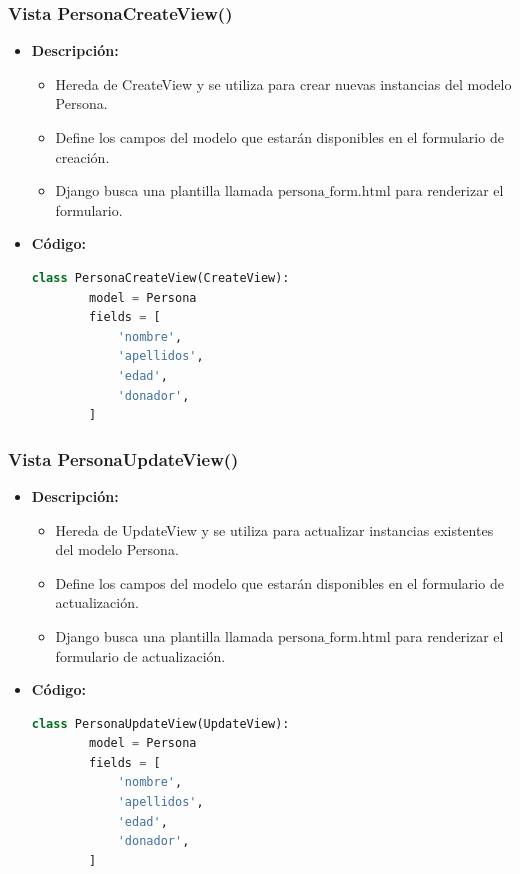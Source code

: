 \documentclass{article}
\begin{document}
  \subsubsection{Vista PersonaCreateView()}
  \begin{itemize}
    \item \textbf{Descripción: }
    \begin{itemize}
      \item Hereda de CreateView y se utiliza para crear nuevas instancias del modelo Persona.
      \item Define los campos del modelo que estarán disponibles en el formulario de creación.
      \item Django busca una plantilla llamada $\text{persona\_form.html}$ para renderizar el formulario.
    \end{itemize}
    \item \textbf{Código: }
    \begin{lstlisting}[language=Python]
      class PersonaCreateView(CreateView):
        model = Persona
        fields = [
            'nombre',
            'apellidos',
            'edad',
            'donador',
        ]
    \end{lstlisting}   
  \end{itemize}
  
  
  \subsubsection{Vista PersonaUpdateView()}
  \begin{itemize}
    \item \textbf{Descripción: }
    \begin{itemize}
      \item Hereda de UpdateView y se utiliza para actualizar instancias existentes del modelo Persona.
      \item Define los campos del modelo que estarán disponibles en el formulario de actualización.
      \item Django busca una plantilla llamada $\text{persona\_form.html}$ para renderizar el formulario de actualización.
    \end{itemize}
    \item \textbf{Código: }
    \begin{lstlisting}[language=Python]
      class PersonaUpdateView(UpdateView):
        model = Persona
        fields = [
            'nombre',
            'apellidos',
            'edad',
            'donador',
        ]
    \end{lstlisting}   
  \end{itemize}
  
\end{document}
